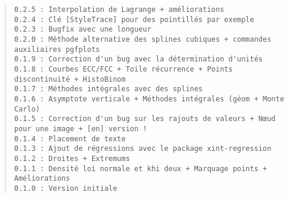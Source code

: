 \documentclass[11pt,a4paper]{ltxdoc}
\begin{document}
{\footnotesize \begin{quote}
\begin{verbatim}
0.2.5 : Interpolation de Lagrange + améliorations
0.2.4 : Clé [StyleTrace] pour des pointillés par exemple
0.2.3 : Bugfix avec une longueur
0.2.0 : Méthode alternative des splines cubiques + commandes auxiliaires pgfplots
0.1.9 : Correction d'un bug avec la détermination d'unités
0.1.8 : Courbes ECC/FCC + Toile récurrence + Points discontinuité + HistoBinom
0.1.7 : Méthodes intégrales avec des splines
0.1.6 : Asymptote verticale + Méthodes intégrales (géom + Monte Carlo)
0.1.5 : Correction d'un bug sur les rajouts de valeurs + Nœud pour une image + [en] version !
0.1.4 : Placement de texte
0.1.3 : Ajout de régressions avec le package xint-regression
0.1.2 : Droites + Extremums
0.1.1 : Densité loi normale et khi deux + Marquage points + Améliorations
0.1.0 : Version initiale
\end{verbatim}
\end{quote}}
\end{document}

